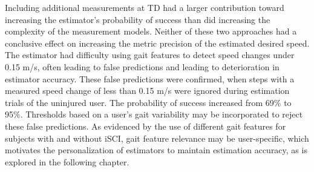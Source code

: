 Including additional measurements at TD had a larger contribution toward increasing the estimator's probability of success than did increasing the complexity of the measurement models. Neither of these two approaches had a conclusive effect on increasing the metric precision of the estimated desired speed. The estimator had difficulty using gait features to detect speed changes under 0.15 m/s, often leading to false predictions and leading to deterioration in estimator accuracy. These false predictions were confirmed, when steps with a measured speed change of less than 0.15 m/s were ignored during estimation trials of the uninjured user. The probability of success increased from 69\% to 95\%. Thresholds based on a user's gait variability may be incorporated to reject these false predictions. As evidenced by the use of different gait features for subjects with and without iSCI, gait feature relevance may be user-specific, which motivates the personalization of estimators to maintain estimation accuracy, as is explored in the following chapter.